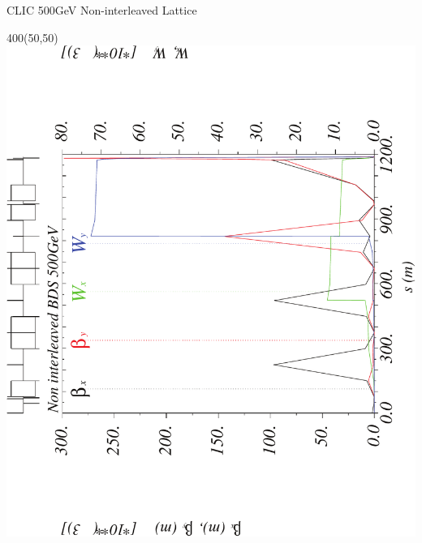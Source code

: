 \documentclass{beamer}
\begin{document}
\begin{frame}{CLIC 500GeV Non-interleaved Lattice}
  \setlength{\TPHorizModule}{1pt}
  \setlength{\TPVertModule}{1pt}
 \begin{textblock}{400}(50,50)
 \includegraphics[scale=0.4,angle=-90]{CLIC500noninter_wxwy-crop.pdf}
 \end{textblock}
\end{frame}
\end{document}
